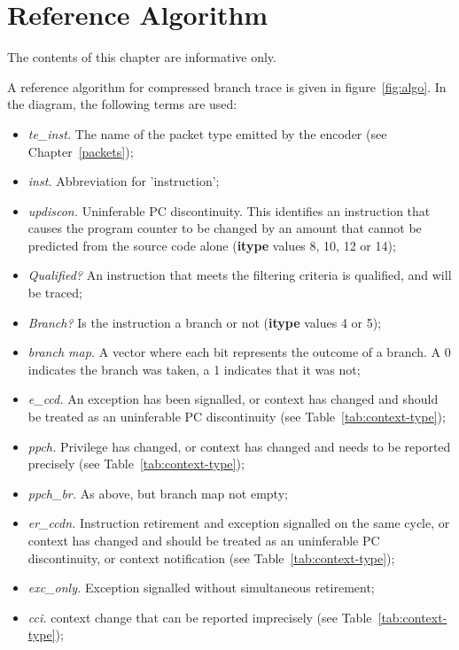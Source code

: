 \chapter{Reference Algorithm} \label{Algorithm}

The contents of this chapter are informative only.

A reference algorithm for compressed branch trace is given in figure~\ref{fig:algo}.  
In the diagram, the following terms are used:

\begin{itemize}
  \item \textit{te\_inst.} The name of the packet type emitted by the encoder (see Chapter~\ref{packets});
  \item \textit{inst.}  Abbreviation for 'instruction';
  \item \textit{updiscon.}  Uninferable PC discontinuity.  This identifies an instruction that
    causes the program counter to be changed by an amount that cannot be predicted from the
    source code alone (\textbf{itype} values 8, 10, 12 or 14);
  \item \textit{Qualified?}  An instruction that meets the filtering criteria is qualified, and will be traced;
  \item \textit{Branch?} Is the instruction a branch or not (\textbf{itype} values 4 or 5);
  \item \textit{branch map.}  A vector where each bit represents the outcome of a branch.  A 0 indicates the
    branch was taken, a 1 indicates that it was not;
  \item \textit{e\_ccd.} An exception has been signalled, or context has changed and
    should be treated as an uninferable PC discontinuity (see Table~\ref{tab:context-type});
  \item \textit{ppch.} Privilege has changed, or context has changed and needs to be 
    reported precisely (see Table~\ref{tab:context-type});
  \item \textit{ppch\_br.} As above, but branch map not empty;
  \item \textit{er\_ccdn.}  Instruction retirement and exception signalled on the same cycle, 
    or context has changed and should be treated as an uninferable PC discontinuity, or
    context notification (see Table~\ref{tab:context-type});
  \item \textit{exc\_only.}  Exception signalled without simultaneous retirement;
  \item \textit{cci.}  context change that can be reported imprecisely (see Table~\ref{tab:context-type});

\end{itemize}

